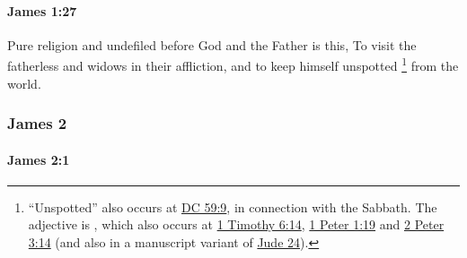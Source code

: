 		\paragraph{James 1:27} %
			\label{JAMES-1-27}

			Pure religion and undefiled before God and the Father is this, To visit the fatherless and widows in their affliction, and to keep himself unspotted%
				\footnote{%
					``Unspotted'' also occurs at \hyperref[DC59-9]{DC 59:9}, in connection with the Sabbath. The adjective is , which also occurs at \hyperref[1TIMOTHY-6-14]{1 Timothy 6:14}, \hyperref[1PETER-1-19]{1 Peter 1:19} and \hyperref[2PETER-3-14]{2 Peter 3:14} (and also in a manuscript variant of \hyperref[JUDE-1-24]{Jude 24}).
					}
			from the world.

			\begin{framed}
			\scriptsize
				\begin{compactdesc}
					\item[SBLG] 
				\end{compactdesc}
			\end{framed}

	\subsubsection{James 2} %
		\label{JAMES-2}
		
		\paragraph{James 2:1} %
			\label{JAMES-2-1}

